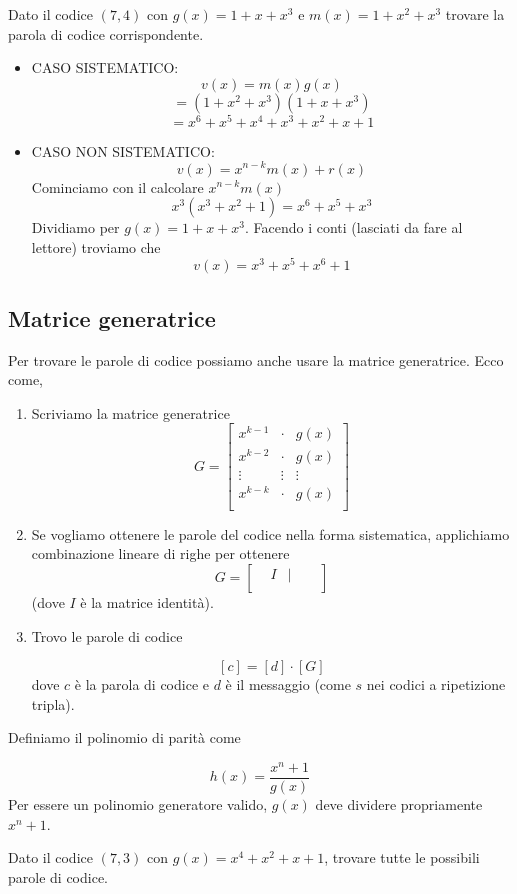 \documentclass[12pt]{report}
\begin{document}
    \begin{exmp}
        Dato il codice $(7,4)$ con $g(x) = 1 + x + x^3$ e $m(x) = 1 + x^2 + x^3$ trovare la parola di codice corrispondente.
        \begin{itemize}
            \item CASO SISTEMATICO: $$v(x) = m(x) g(x)$$
            $$= (1 + x^2 + x^3) (1+x+x^3)$$
            $$= x^6 + x^5 + x^4 + x^3 + x^2 + x + 1$$
            \item CASO NON SISTEMATICO:
            $$v(x) = x^{n-k} m(x) + r(x)$$
            Cominciamo con il calcolare $x^{n-k} m(x)$
            $$x^3(x^3 + x^2 + 1) = x^6 + x^5 + x^3$$
            Dividiamo per $g(x) = 1 + x + x^3$. Facendo i conti (lasciati da fare al lettore) troviamo che
            $$v(x) = x^3 + x^5 + x^6 + 1$$
        \end{itemize}
    \end{exmp}

    \subsection{Matrice generatrice}
    Per trovare le parole di codice possiamo anche usare la matrice generatrice. Ecco come,

    \begin{enumerate}
        \item Scriviamo la matrice generatrice
        \[
            G = \begin{bmatrix}
                    x^{k-1} & \cdot & g(x) \\
                    x^{k-2} & \cdot & g(x) \\
                    \vdots & \vdots & \vdots \\
                    x^{k-k} & \cdot & g(x) \\
            \end{bmatrix}
        \]
        \item Se vogliamo ottenere le parole del codice nella forma sistematica, applichiamo combinazione lineare di righe per ottenere
        \[
            G = \begin{bmatrix}
                    & I  & | & &\\
            \end{bmatrix}
        \]
        (dove $I$ è la matrice identità).
        \item Trovo le parole di codice

        $$[c] = [d] \cdot [G]$$
        dove $c$ è la parola di codice e $d$ è il messaggio (come $s$ nei codici a ripetizione tripla).
    \end{enumerate}

    \noindent
    Definiamo il polinomio di parità come

    $$h(x) = \frac{x^n + 1}{g(x)}$$
    Per essere un polinomio generatore valido, $g(x)$ deve dividere propriamente $x^n + 1$.

    \begin{es}
        Dato il codice $(7,3)$ con $g(x) = x^4 + x^2 + x + 1$, trovare tutte le possibili parole di codice.
    \end{es}
\end{document}
